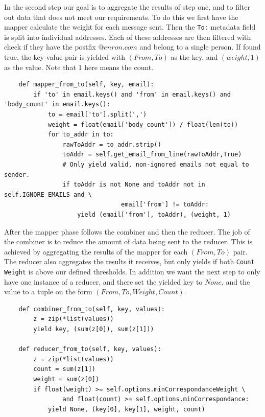 \documentclass[runningheads,a4paper]{llncs}
\begin{document}
In the second step our goal is to aggregate the results of step one, and to filter out data that does not meet our requirements. To do this we first have the mapper calculate the weight for each message sent. Then the \verb!To:! metadata field is split into individual addresses. Each of these addresses are then filtered with check if they have the postfix $@enron.com$ and belong to a single person. If found true, the key-value pair is yielded with $(From, To)$ as the key, and $(weight, 1)$ as the value. Note that 1 here means the count.

\begin{verbatim}
    def mapper_from_to(self, key, email):
        if 'to' in email.keys() and 'from' in email.keys() and 'body_count' in email.keys():
            to = email['to'].split(',')
            weight = float(email['body_count']) / float(len(to))
            for to_addr in to:
                rawToAddr = to_addr.strip()
                toAddr = self.get_email_from_line(rawToAddr,True)
                # Only yield valid, non-ignored emails not equal to sender.
                if toAddr is not None and toAddr not in self.IGNORE_EMAILS and \
                                email['from'] != toAddr:
                    yield (email['from'], toAddr), (weight, 1)
\end{verbatim}

After the mapper phase follows the combiner and then the reducer. The job of the combiner is to reduce the amount of data being sent to the reducer. This is achieved by aggregating the results of the mapper for each $(From, To)$ pair. The reducer also aggregates the results it receives, but only yields if both \verb!Count! \verb!Weight! is above our defined thresholds. In addition we want the next step to only have one instance of a reducer, and there set the yielded key to $None$, and the value to a tuple on the form $(From, To, Weight, Count)$.

\begin{verbatim}
    def combiner_from_to(self, key, values):
        z = zip(*list(values))
        yield key, (sum(z[0]), sum(z[1]))

    def reducer_from_to(self, key, values):
        z = zip(*list(values))
        count = sum(z[1])
        weight = sum(z[0])
        if float(weight) >= self.options.minCorrespondanceWeight \
                and float(count) >= self.options.minCorrespondance:
            yield None, (key[0], key[1], weight, count)
\end{verbatim}
\end{document}

